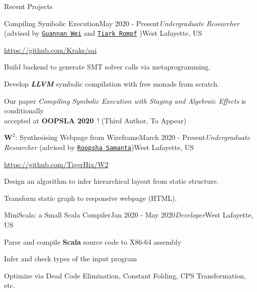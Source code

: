 \documentclass{resume} %
\begin{document}
\begin{rSection}{Recent Projects}

\begin{rSubsection}{Compiling Symbolic Execution}{May 2020 - Present}{\textit{Undergraduate Researcher} (advised by \href{http://continuation.passing.style/}{\texttt{Guannan Wei}} and \href{http://tiarkrompf.github.io/}{\texttt{Tiark Rompf}} )}{West Lafayette, US}
\item \url{https://github.com/Kraks/sai}
\item Build backend to generate SMT solver calls via metaprogramming.
\item Develop \textbf{\it LLVM} symbolic compilation with free monads from scratch. 
\item Our paper \textit{Compiling Symbolic Execution with Staging and Algebraic Effects} is conditionally\\ accepted at \textbf{OOPSLA 2020}\ ! (Third Author, To Appear)
\end{rSubsection}


\begin{rSubsection}{$\mathbf{W}^2$: Synthesising Webpage from Wireframe}{March 2020 - Present}{\textit{Undergraduate Researcher} (advised by \href{https://www.cs.purdue.edu/homes/roopsha/}{\texttt{Roopsha Samanta}})}{West Lafayette, US}
\item \url{https://github.com/TigerHix/W2}
\item Design an algorithm to infer hierarchical layout from static structure.
\item Transform static graph to responsive webpage (HTML).

\end{rSubsection}

\begin{rSubsection}{MiniScala: a Small Scala Compiler}{Jan 2020 - May 2020}{\textit{Developer}}{West Lafayette, US}
\item Parse and compile \textbf{Scala} source code to X86-64 assembly
\item Infer and check types of the input program
\item Optimize via Dead Code Elimination, Constant Folding, CPS Transformation, etc.

\end{rSubsection}


\end{rSection}
\end{document}
